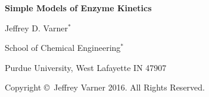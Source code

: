 \documentclass[11pt]{article}
\theoremstyle{definition}
\begin{document}
{\par\centering\textbf{\Large Simple Models of Enzyme Kinetics}}
\vspace{0.2in}
{\par \centering \large{Jeffrey D. Varner$^{*}$}}
\vspace{0.05in}
{\par \centering \large{School of Chemical Engineering$^{*}$}}
{\par \centering \large{Purdue University, West Lafayette IN 47907}}
\vspace{0.1in}
{\par \centering \small{Copyright \copyright\ Jeffrey Varner 2016. All Rights Reserved.}}\\

\date{}
\thispagestyle{empty}

\setcounter{page}{1}

\end{document}

